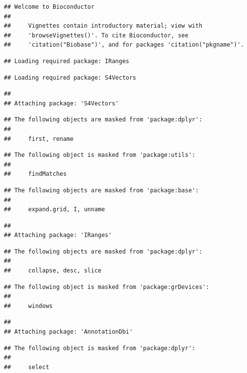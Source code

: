 \documentclass[
]{article}
\begin{document}
\begin{verbatim}
## Welcome to Bioconductor
## 
##     Vignettes contain introductory material; view with
##     'browseVignettes()'. To cite Bioconductor, see
##     'citation("Biobase")', and for packages 'citation("pkgname")'.
\end{verbatim}

\begin{verbatim}
## Loading required package: IRanges
\end{verbatim}

\begin{verbatim}
## Loading required package: S4Vectors
\end{verbatim}

\begin{verbatim}
## 
## Attaching package: 'S4Vectors'
\end{verbatim}

\begin{verbatim}
## The following objects are masked from 'package:dplyr':
## 
##     first, rename
\end{verbatim}

\begin{verbatim}
## The following object is masked from 'package:utils':
## 
##     findMatches
\end{verbatim}

\begin{verbatim}
## The following objects are masked from 'package:base':
## 
##     expand.grid, I, unname
\end{verbatim}

\begin{verbatim}
## 
## Attaching package: 'IRanges'
\end{verbatim}

\begin{verbatim}
## The following objects are masked from 'package:dplyr':
## 
##     collapse, desc, slice
\end{verbatim}

\begin{verbatim}
## The following object is masked from 'package:grDevices':
## 
##     windows
\end{verbatim}

\begin{verbatim}
## 
## Attaching package: 'AnnotationDbi'
\end{verbatim}

\begin{verbatim}
## The following object is masked from 'package:dplyr':
## 
##     select
\end{verbatim}
\end{document}
